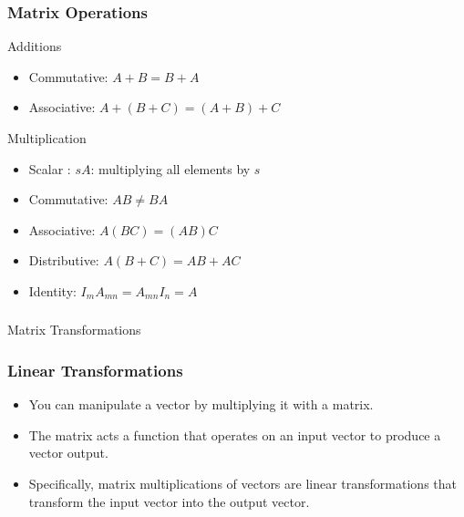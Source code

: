   \begin{frame}[fragile]\frametitle{Matrix Operations}
Additions
\begin{itemize}
\item Commutative: $A + B = B + A$
\item Associative: $A + (B + C) = (A + B) + C$
\end{itemize}
Multiplication
\begin{itemize}
\item Scalar : $sA$: multiplying all elements by $s$
\item Commutative: $AB \neq BA$
\item Associative: $A(BC)  =  (AB)C$
\item Distributive: $A(B + C)  =  AB + AC$
\item Identity: $ I_mA_{mn}  =  A_{mn}I_n  =  A$
\end{itemize}
\end{frame}

  \begin{frame}[fragile]\frametitle{}
\begin{center}
{\Large Matrix Transformations}
\end{center}
\end{frame}

 \begin{frame}[fragile] \frametitle{Linear Transformations}

\begin{itemize}

\item You can manipulate a vector by multiplying it with a matrix. 
\item The matrix acts a function that operates on an input vector to produce a vector output. 
\item Specifically, matrix multiplications of vectors are linear transformations that transform the input vector into the output vector.
\end{itemize}

\end{frame}


